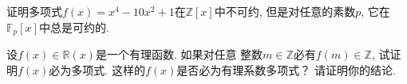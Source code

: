 \begin{solution}
    
\end{solution}

\begin{problem}
    证明多项式$f(x) = x^4 - 10x^2 + 1$在$\mathbb{Z}[x]$中不可约, 
但是对任意的素数$p$, 它在$\mathbb{F}_p[x]$中总是可约的.
\end{problem}

\begin{solution}
    
\end{solution}

\begin{problem}
    设$f(x) \in \mathbb{R}(x)$是一个有理函数. 如果对任意
整数$m \in \mathbb{Z}$必有$f(m) \in \mathbb{Z}$,
试证明$f(x)$必为多项式. 这样的$f(x)$是否必为有理系数多项式？
请证明你的结论.
\end{problem}

\begin{solution}
    
\end{solution}